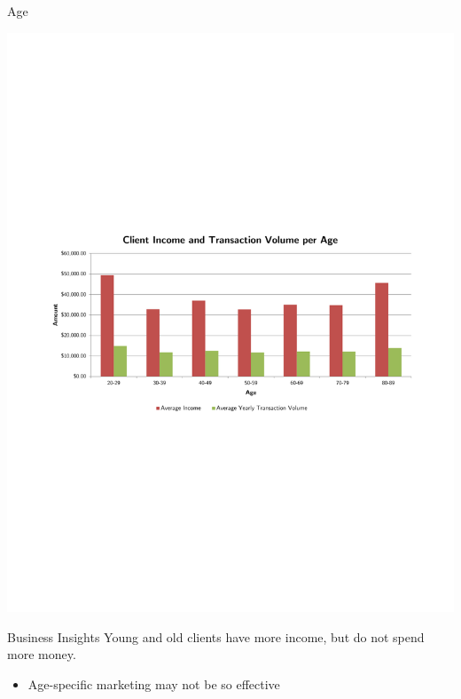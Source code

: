 \documentclass[xcolor=dvipsnames]{beamer}
\begin{document}
\begin{frame}[t]{Age}
\vspace{-2pt}
	\centerline{\includegraphics[width=1.05\textwidth]{age-money}}
	\vspace{-6pt}
	\begin{block}{Business Insights}
		\small
		Young and old clients have more income, but do not spend more money.\\[-8pt]
		\begin{itemize}
			\item Age-specific marketing may not be so effective
		\end{itemize}
	\end{block}
\end{frame}

\setcounter{section}{0}
\setcounter{subsection}{0}
\end{document}
